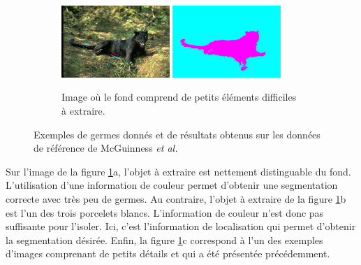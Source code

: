 \begin{figure}[htb]
\begin{subfigure}[B]{\textwidth}
	\end{subfigure}	
	\\	
	 \begin{subfigure}[B]{\textwidth}	
	 \centering
			\includegraphics[width=0.45\textwidth]{images/evaluation/McGuinness/304034_seeds.jpg}
			\includegraphics[width=0.45\textwidth]{images/evaluation/McGuinness/304034_seg.png}
		 \caption{Image où le fond comprend de petits éléments difficiles à extraire.}
	\end{subfigure}	
	\caption{Exemples de germes donnés et de résultats obtenus  sur les données de référence de McGuinness \textit{et al.} }
	\label{fig:eval:ResMG}
\end{figure}

 Sur l'image de la figure \ref{fig:eval:ResMG}a, l'objet à extraire est nettement distinguable du fond. L'utilisation d'une information de couleur permet d'obtenir une segmentation correcte avec très peu de germes. Au contraire, l'objet à extraire de la figure \ref{fig:eval:ResMG}b est l'un des trois porcelets blancs. L'information de couleur n'est donc pas suffisante pour l'isoler. Ici, c'est l'information de localisation qui permet d'obtenir la segmentation désirée. Enfin, la figure \ref{fig:eval:ResMG}c correspond à l'un des exemples d'images comprenant de petits détails et qui a été présentée précédemment. 

